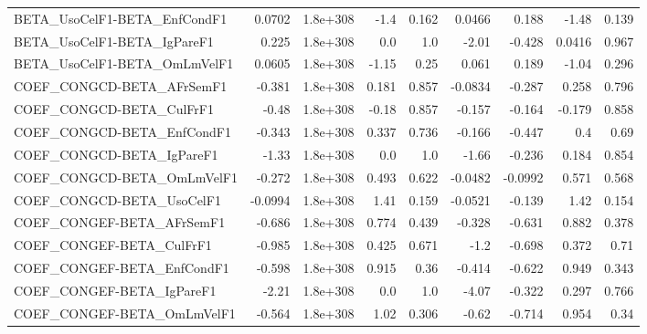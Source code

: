 \begin{tabular}{lrrrrrrrr}
BETA\_UsoCelF1-BETA\_EnfCondF1          &      0.0702 &     1.8e+308 &     -1.4 &    0.162 &     0.0466 &       0.188 &        -1.48 &         0.139 \\
BETA\_UsoCelF1-BETA\_IgPareF1           &       0.225 &     1.8e+308 &      0.0 &      1.0 &      -2.01 &      -0.428 &       0.0416 &         0.967 \\
BETA\_UsoCelF1-BETA\_OmLmVelF1          &      0.0605 &     1.8e+308 &    -1.15 &     0.25 &      0.061 &       0.189 &        -1.04 &         0.296 \\
COEF\_CONGCD-BETA\_AFrSemF1             &      -0.381 &     1.8e+308 &    0.181 &    0.857 &    -0.0834 &      -0.287 &        0.258 &         0.796 \\
COEF\_CONGCD-BETA\_CulFrF1              &       -0.48 &     1.8e+308 &    -0.18 &    0.857 &     -0.157 &      -0.164 &       -0.179 &         0.858 \\
COEF\_CONGCD-BETA\_EnfCondF1            &      -0.343 &     1.8e+308 &    0.337 &    0.736 &     -0.166 &      -0.447 &          0.4 &          0.69 \\
COEF\_CONGCD-BETA\_IgPareF1             &       -1.33 &     1.8e+308 &      0.0 &      1.0 &      -1.66 &      -0.236 &        0.184 &         0.854 \\
COEF\_CONGCD-BETA\_OmLmVelF1            &      -0.272 &     1.8e+308 &    0.493 &    0.622 &    -0.0482 &     -0.0992 &        0.571 &         0.568 \\
COEF\_CONGCD-BETA\_UsoCelF1             &     -0.0994 &     1.8e+308 &     1.41 &    0.159 &    -0.0521 &      -0.139 &         1.42 &         0.154 \\
COEF\_CONGEF-BETA\_AFrSemF1             &      -0.686 &     1.8e+308 &    0.774 &    0.439 &     -0.328 &      -0.631 &        0.882 &         0.378 \\
COEF\_CONGEF-BETA\_CulFrF1              &      -0.985 &     1.8e+308 &    0.425 &    0.671 &       -1.2 &      -0.698 &        0.372 &          0.71 \\
COEF\_CONGEF-BETA\_EnfCondF1            &      -0.598 &     1.8e+308 &    0.915 &     0.36 &     -0.414 &      -0.622 &        0.949 &         0.343 \\
COEF\_CONGEF-BETA\_IgPareF1             &       -2.21 &     1.8e+308 &      0.0 &      1.0 &      -4.07 &      -0.322 &        0.297 &         0.766 \\
COEF\_CONGEF-BETA\_OmLmVelF1            &      -0.564 &     1.8e+308 &     1.02 &    0.306 &      -0.62 &      -0.714 &        0.954 &          0.34 \\

\end{tabular}
